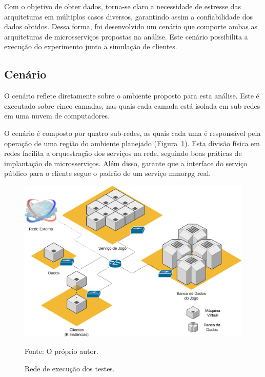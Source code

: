 Com o objetivo de obter dados, torna-se claro a necessidade de estresse das arquiteturas em múltiplos casos diversos, garantindo assim a confiabilidade dos dados obtidos.
%
Dessa forma, foi desenvolvido um cenário que comporte ambas as arquiteturas de microsserviços propostas na análise.
%
Este cenário possibilita a execução do experimento junto a simulação de clientes.



\subsection{Cenário}



O cenário reflete diretamente sobre o ambiente proposto para esta análise.
%
Este é executado sobre cinco camadas, nas quais cada camada está isolada em sub-redes em uma nuvem de computadores.

O cenário é composto por quatro sub-redes, as quais cada uma é responsável pela operação de uma região do ambiente planejado (Figura~\ref{fig:cenario}).
%
Esta divisão física em redes facilita a orquestração dos serviços na rede, seguindo boas práticas de implantação de microsserviços.
%
Além disso, garante que a interface do serviço público para o cliente segue o padrão de um serviço \ac{mmorpg} real.

\begin{figure}[htb!]
  \caption{Rede de execução dos testes.}
  \label{fig:cenario}
  \includegraphics[width=\textwidth]{img/cap3/cenario.png}
  \centering

  Fonte: O próprio autor.
\end{figure}

